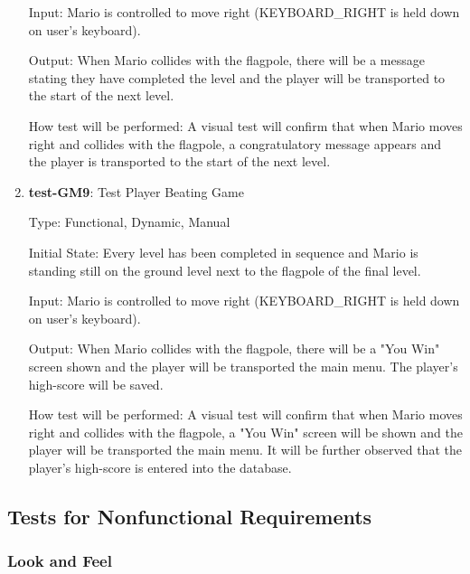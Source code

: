 \documentclass[12pt, titlepage]{article}
\begin{document}
\begin{enumerate}
Input: Mario is controlled to move right (KEYBOARD\_RIGHT is held down on user's keyboard).
					
Output: When Mario collides with the flagpole, there will be a message stating they have completed the level and the player will be transported to the start of the next level.
					
How test will be performed: A visual test will confirm that when Mario moves right and collides with the flagpole, a congratulatory message appears and the player is transported to the start of the next level.

\item{\textbf{test-GM9}: Test Player Beating Game\\}

Type: Functional, Dynamic, Manual

Initial State: Every level has been completed in sequence and Mario is standing still on the ground level next to the flagpole of the final level.
					
Input: Mario is controlled to move right (KEYBOARD\_RIGHT is held down on user's keyboard).
					
Output: When Mario collides with the flagpole, there will be a "You Win" screen shown and the player will be transported the main menu. The player's high-score will be saved.
					
How test will be performed: A visual test will confirm that when Mario moves right and collides with the flagpole, a "You Win" screen will be shown and the player will be transported the main menu. It will be further observed that the player's high-score is entered into the database.

\end{enumerate}

\subsection{Tests for Nonfunctional Requirements}

\subsubsection{Look and Feel}
\end{document}
